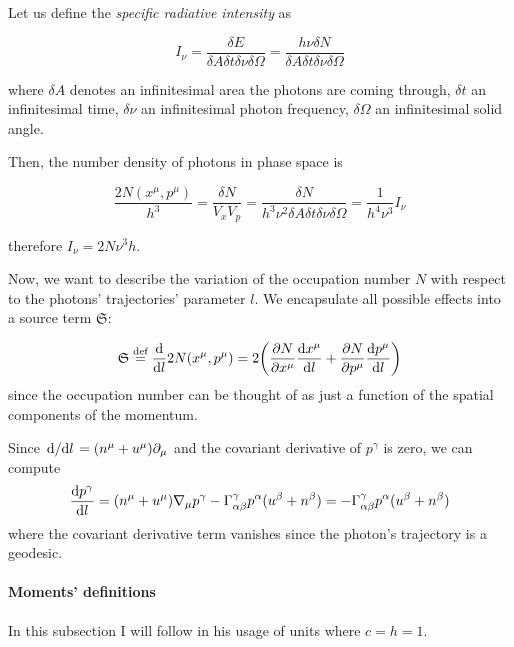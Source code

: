\documentclass[main.tex]{subfiles}
\begin{document}
Let us define the \emph{specific radiative intensity} as

\begin{equation}
  I_\nu = \frac{\delta E}{\delta A \delta  t \delta \nu \delta \Omega}
  = \frac{h \nu \delta N}{\delta A \delta  t \delta \nu \delta \Omega}
\end{equation}

where \(\delta A\) denotes an infinitesimal area the photons are coming through, \(\delta t\) an infinitesimal time, \(\delta \nu\) an infinitesimal photon frequency, \(\delta \Omega\) an infinitesimal solid angle.

Then, the number density of photons in phase space is \cite[figure 22.2]{MisnerThorneWheeler:1973}

\begin{equation}
  \frac{2N(x^\mu, p^\mu)}{h^3} = \frac{\delta N}{V_x V_p} =  \frac{\delta N}{h^3 \nu^2\delta A \delta  t \delta \nu \delta \Omega} = \frac{1}{h^4 \nu^3} I_\nu
\end{equation}

therefore \(I_\nu = 2 N \nu^3 h\).

Now, we want to describe the variation of the occupation number \(N\) with respect to the photons' trajectories' parameter \(l\). We encapsulate all possible effects into a source term \(\mathfrak S\):

\begin{equation}
    \mathfrak S \stackrel{\text{def}}{=} \dv{}{l} 2N(x^\mu, p^\mu) =
    2 \qty(\pdv{N}{x^\mu} \dv{x^\mu}{l} + \pdv{N}{p^\mu} \dv{p^\mu}{l}  )
\end{equation}
since the occupation number can be thought of as just a function of the spatial components of the momentum.

Since \(\dv*{}{l} = (n^\mu + u^\mu) \partial_\mu\) and the covariant derivative of \(p^\gamma\) is zero, we can compute
\begin{equation}
  \dv{p^\gamma}{l} = (n^\mu + u^\mu ) \nabla_\mu p^\gamma - \Gamma ^\gamma _{\alpha \beta} p^\alpha (u^\beta + n^\beta)
  = - \Gamma ^\gamma _{\alpha \beta} p^\alpha (u^\beta + n^\beta)
\end{equation}
where the covariant derivative term vanishes since the photon's trajectory is a geodesic.

\paragraph{Moments' definitions}

In this subsection I will follow \textcite[]{Thorne:1981feb} in his usage of units where \(c=h=1\).
\end{document}
